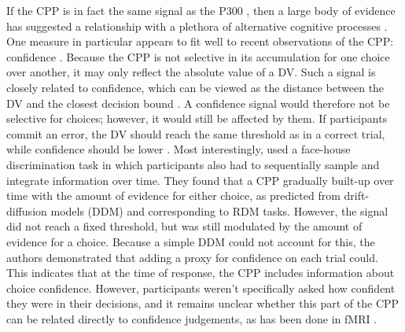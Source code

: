If the CPP is in fact the same signal as the P300 \parencite{Twomey2015}, then a large body of evidence has suggested a relationship with a plethora of alternative cognitive processes \parencite{Nieuwenhuis2011,Nieuwenhuis2005}. One measure in particular appears to fit well to recent observations of the CPP: confidence \parencite{Hillyard1971,Squires1973}. Because the CPP is not selective in its accumulation for one choice over another, it may only reflect the absolute value of a DV. Such a signal is closely related to confidence, which can be viewed as the distance between the DV and the closest decision bound \parencite{Urai2014}. A confidence signal would therefore not be selective for choices; however, it would still be affected by them. If participants commit an error, the DV should reach the same threshold as in a correct trial, while confidence should be lower \parencite{Shadlen2013}. Most interestingly, \textcite{Philiastides2014} used a face-house discrimination task in which participants also had to sequentially sample and integrate information over time. They found that a CPP gradually built-up over time with the amount of evidence for either choice, as predicted from drift-diffusion models (DDM) and corresponding to RDM tasks. However, the signal did not reach a fixed threshold, but was still modulated by the amount of evidence for a choice. Because a simple DDM could not account for this, the authors demonstrated that adding a proxy for confidence on each trial could. This indicates that at the time of response, the CPP includes information about choice confidence. However, participants weren’t specifically asked how confident they were in their decisions, and it remains unclear whether this part of the CPP can be related directly to confidence judgements, as has been done in fMRI \parencite[e.g.,][]{Hebart2016}.

